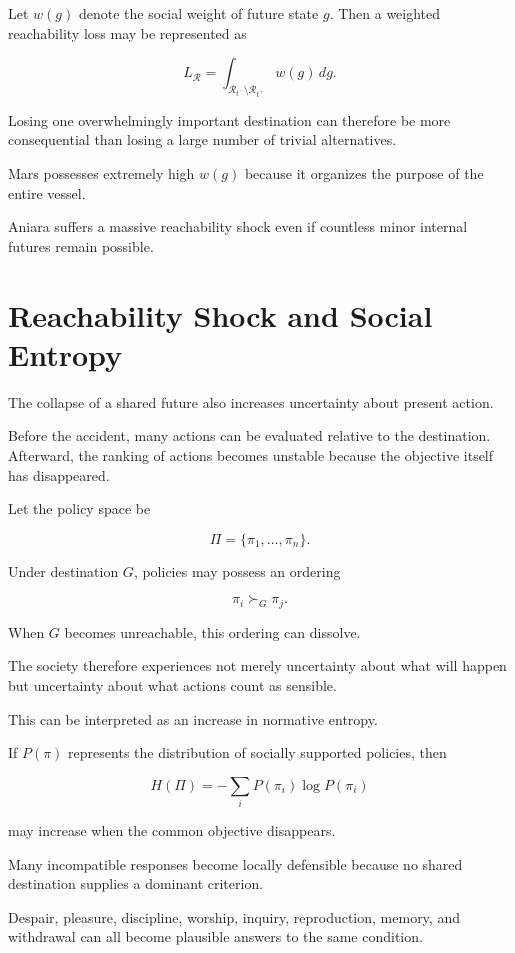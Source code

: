 \documentclass[11pt,oneside]{book}
\theoremstyle{definition}
\theoremstyle{remark}
\newcommand{\R}{\mathcal{R}}
\begin{document}
Let \(w(g)\) denote the social weight of future state \(g\). Then a weighted reachability loss may be represented as

\[
L_{\R}
=
\int_{\R_{t^-}\setminus\R_{t^+}}
w(g)\,dg.
\]

Losing one overwhelmingly important destination can therefore be more consequential than losing a large number of trivial alternatives.

Mars possesses extremely high \(w(g)\) because it organizes the purpose of the entire vessel.

Aniara suffers a massive reachability shock even if countless minor internal futures remain possible.

\section{Reachability Shock and Social Entropy}

The collapse of a shared future also increases uncertainty about present action.

Before the accident, many actions can be evaluated relative to the destination. Afterward, the ranking of actions becomes unstable because the objective itself has disappeared.

Let the policy space be

\[
\Pi
=
\{\pi_1,\ldots,\pi_n\}.
\]

Under destination \(G\), policies may possess an ordering

\[
\pi_i\succ_G\pi_j.
\]

When \(G\) becomes unreachable, this ordering can dissolve.

The society therefore experiences not merely uncertainty about what will happen but uncertainty about what actions count as sensible.

This can be interpreted as an increase in normative entropy.

If \(P(\pi)\) represents the distribution of socially supported policies, then

\[
H(\Pi)
=
-\sum_iP(\pi_i)\log P(\pi_i)
\]

may increase when the common objective disappears.

Many incompatible responses become locally defensible because no shared destination supplies a dominant criterion.

Despair, pleasure, discipline, worship, inquiry, reproduction, memory, and withdrawal can all become plausible answers to the same condition.
\end{document}
